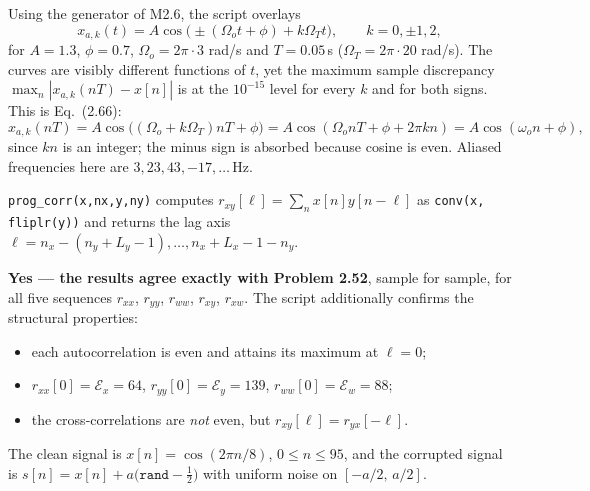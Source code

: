 
Using the generator of M2.6, the script overlays
\[
x_{a,k}(t)=A\cos\bigl(\pm(\Omega_o t+\phi)+k\Omega_T t\bigr),\qquad k=0,\pm1,2,
\]
for $A=1.3$, $\phi=0.7$, $\Omega_o=2\pi\cdot 3$ rad/s and $T=0.05$\,s
($\Omega_T=2\pi\cdot20$ rad/s). The curves are visibly different functions of $t$, yet the
maximum sample discrepancy $\max_n|x_{a,k}(nT)-x[n]|$ is at the $10^{-15}$ level for every
$k$ and for both signs. This is Eq.\ (2.66):
\[
x_{a,k}(nT)=A\cos\bigl((\Omega_o+k\Omega_T)nT+\phi\bigr)
           =A\cos(\Omega_o nT+\phi+2\pi kn)=A\cos(\omega_o n+\phi),
\]
since $kn$ is an integer; the minus sign is absorbed because cosine is even. Aliased
frequencies here are $3,23,43,-17,\dots$\,Hz.


\texttt{prog\_corr(x,nx,y,ny)} computes $r_{xy}[\ell]=\sum_n x[n]y[n-\ell]$ as
\texttt{conv(x, fliplr(y))} and returns the lag axis
$\ell = n_x-(n_y+L_y-1),\dots,n_x+L_x-1-n_y$.

\textbf{Yes --- the results agree exactly with Problem 2.52}, sample for sample, for all five
sequences $r_{xx}$, $r_{yy}$, $r_{ww}$, $r_{xy}$, $r_{xw}$. The script additionally confirms
the structural properties:
\begin{itemize}[leftmargin=1.4em,itemsep=1pt]
\item each autocorrelation is even and attains its maximum at $\ell=0$;
\item $r_{xx}[0]=\mathcal{E}_x=64$, $r_{yy}[0]=\mathcal{E}_y=139$,
      $r_{ww}[0]=\mathcal{E}_w=88$;
\item the cross-correlations are \emph{not} even, but $r_{xy}[\ell]=r_{yx}[-\ell]$.
\end{itemize}




The clean signal is $x[n]=\cos(2\pi n/8)$, $0\le n\le 95$, and the corrupted signal is
$s[n]=x[n]+a\bigl(\texttt{rand}-\tfrac12\bigr)$ with uniform noise on
$[-a/2,\,a/2]$.

